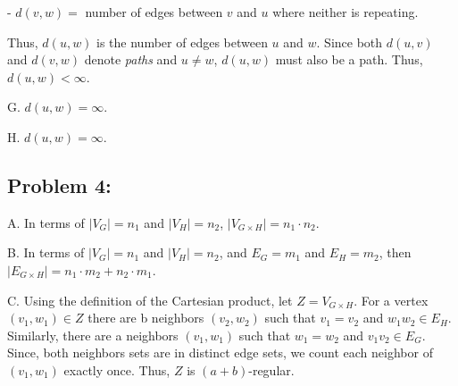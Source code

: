 \documentclass[12pt,letterpaper]{article}
\begin{document}
- $d(v,w) = $ number of edges between $v$ and $u$ where neither is repeating.

Thus, $d(u,w)$ is the number of edges between $u$ and $w$. Since both $d(u,v)$
and $d(v,w)$ denote \emph{paths} and $u \neq w$, $d(u,w)$ must also be a path.
Thus, $d(u,w) < \infty$.

G. $d(u,w) = \infty$.

H. $d(u,w) = \infty$.

\subsection*{Problem 4:}

A. In terms of $|V_G| = n_1$ and $|V_H| = n_2 $, $|V_{G {\times} H}| = n_1
\cdot n_2 $.

B. In terms of $|V_G| = n_1$ and $|V_H| = n_2$, and $E_G = m_1$ and $E_H =
m_2$, then $|E_{G {\times} H}| = n_1 \cdot m_2 + n_2 \cdot m_1$.

C. Using the definition of the Cartesian product, let $Z = V_{G {\times} H}$.
For a vertex $(v_1, w_1) \in Z$ there are b neighbors $(v_2, w_2)$ such that
$v_1 = v_2$ and $w_1w_2 \in E_H$. Similarly, there are a neighbors $(v_1, w_1)$
such that $w_1 = w_2$ and $v_1v_2 \in E_G$. Since, both neighbors sets are in
distinct edge sets, we count each neighbor of $(v_1, w_1)$ exactly once. Thus,
$Z$ is $(a + b)$-regular.
\end{document}
